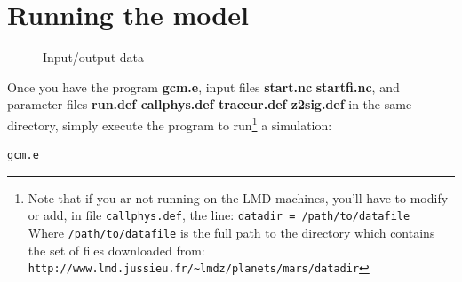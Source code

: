 \section{Running the model}
\label{sc:running_gcm}
\begin{figure}
\centerline{}
\caption{Input/output data}
\label{fig:inout}
\end{figure}

Once you have the program {\bf gcm.e},
input files {\bf start.nc} {\bf startfi.nc},
and parameter files {\bf run.def callphys.def traceur.def z2sig.def}
in the same directory,
simply execute the program to run\footnote{
Note that if you ar not running on the LMD machines, you'll have to
modify or add, in file {\tt callphys.def}, the line:
{\tt datadir = /path/to/datafile}\\
Where {\tt /path/to/datafile} is the full path to the directory which
contains the set of files downloaded from:\\
\verb+http://www.lmd.jussieu.fr/~lmdz/planets/mars/datadir+
}
a simulation: 
\begin{verbatim}
gcm.e
\end{verbatim}

